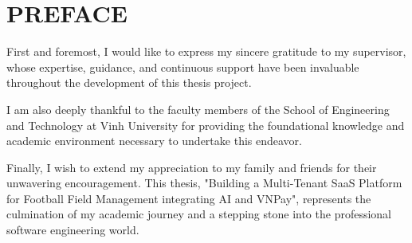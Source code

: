 \section*{PREFACE}
\thispagestyle{empty}
First and foremost, I would like to express my sincere gratitude to my supervisor, whose expertise, guidance, and continuous support have been invaluable throughout the development of this thesis project.

I am also deeply thankful to the faculty members of the School of Engineering and Technology at Vinh University for providing the foundational knowledge and academic environment necessary to undertake this endeavor.

Finally, I wish to extend my appreciation to my family and friends for their unwavering encouragement. This thesis, "Building a Multi-Tenant SaaS Platform for Football Field Management integrating AI and VNPay", represents the culmination of my academic journey and a stepping stone into the professional software engineering world.

\cleardoublepage